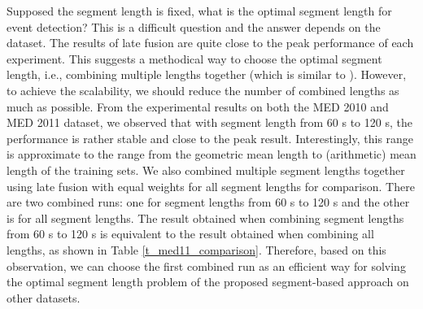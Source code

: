 Supposed the segment length is fixed, what is the optimal segment length for event detection? This is a difficult question and the answer depends on the dataset. The results of late fusion are quite close to the peak performance of each experiment. This suggests a methodical way to choose the optimal segment length, i.e., combining multiple lengths together (which is similar to \cite{DBLP:conf/eccv/JiangYY12}). However, to achieve the scalability, we should reduce the number of combined lengths as much as possible. From the experimental results on both the MED 2010 and MED 2011 dataset, we observed that with segment length from 60 s to 120 s, the performance is rather stable and close to the peak result. Interestingly, this range is approximate to the range from the geometric mean length to (arithmetic) mean length of the training sets. We also combined multiple segment lengths together using late fusion with equal weights for all segment lengths for comparison. There are two combined runs: one for segment lengths from 60 s to 120 s and the other is for all segment lengths. The result obtained when combining segment lengths from 60 s to 120 s is equivalent to the result obtained when combining all lengths, as shown in Table \ref{t_med11_comparison}. Therefore, based on this observation, we can choose the first combined run as an efficient way for solving the optimal segment length problem of the proposed segment-based approach on other datasets.

